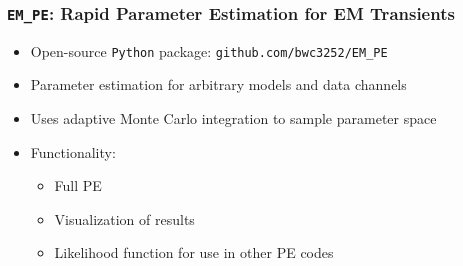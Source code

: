 \documentclass{beamer}
\begin{document}
\begin{frame}[fragile] \frametitle{\texttt{EM\_PE}: Rapid Parameter Estimation for EM Transients}
    \begin{itemize}
      \item Open-source \texttt{Python} package: \texttt{github.com/bwc3252/EM\_PE} \pause
      \item Parameter estimation for arbitrary models and data channels \pause
      \item Uses adaptive Monte Carlo integration to sample parameter space \pause
      \item Functionality: \pause
      \begin{itemize}
        \item Full PE \pause
        \item Visualization of results \pause
        \item Likelihood function for use in other PE codes
      \end{itemize}
    \end{itemize}
\end{frame}


\end{document}
